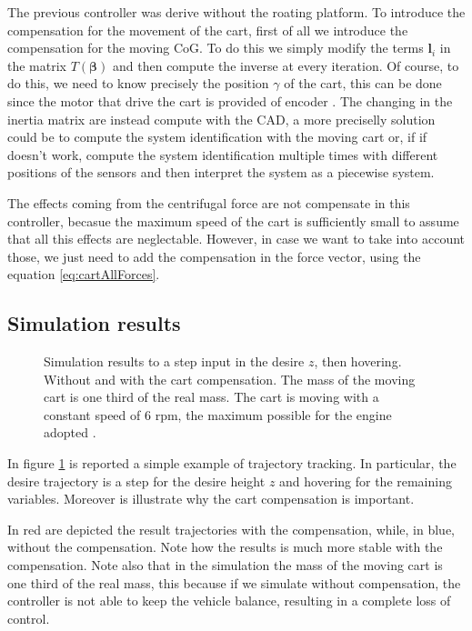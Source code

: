 \noindent The previous controller was derive without the roating platform. To introduce the compensation for the movement of the cart, first of all we introduce the compensation for the moving CoG. To do this we simply modify the terms $\mathbf{l}_i$ in the matrix $T(\boldsymbol{\beta})$ and then compute the inverse at every iteration. Of course, to do this, we need to know precisely the position $\gamma$ of the cart, this can be done since the motor that drive the cart is provided of encoder \cite{Carlos}. The changing in the inertia matrix are instead compute with the CAD, a more preciselly solution could be to compute the system identification with the moving cart or, if if doesn't work, compute the system identification multiple times with different positions of the sensors and then interpret the system as a piecewise system. 

\noindent The effects coming from the centrifugal force are not compensate in this controller, becasue the maximum speed of the cart is sufficiently small to assume that all this effects are neglectable. However, in case we want to take into account those, we just need to add the compensation in the force vector, using the equation \eqref{eq:cartAllForces}.

\subsection{Simulation results}

\begin{figure}[h]
	\centering
 	
 	\caption{Simulation results to a step input in the desire $z$, then hovering. Without and with the cart compensation. The mass of the moving cart is one third of the real mass. The cart is moving with a constant speed of $6$ rpm, the maximum possible for the engine adopted \cite{Carlos}.}
 	\label{fig:simulation1}		
\end{figure}

\noindent In figure \ref{fig:simulation1} is reported a simple example of trajectory tracking. In particular, the desire trajectory is a step for the desire height $z$ and hovering for the remaining variables. Moreover is illustrate why the cart compensation is important. 

\noindent In red are depicted the result trajectories with the compensation, while, in blue, without the compensation. Note how the results is much more stable with the compensation. Note also that in the simulation the mass of the moving cart is one third of the real mass, this because if we simulate without compensation, the controller is not able to keep the vehicle balance, resulting in a complete loss of control. 

